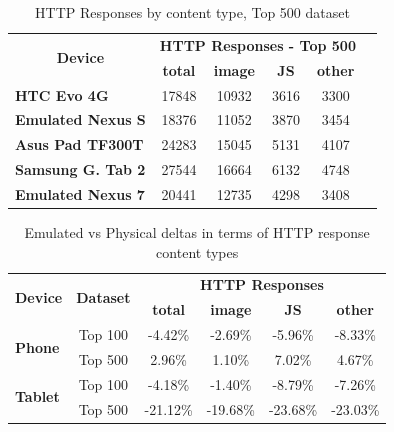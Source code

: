 \documentclass{acm_proc_article-sp}
\begin{document}
\begin{table}[htbp]
  \centering
  \caption{HTTP Responses by content type, Top 500 dataset}
    \begin{tabular}{|c|c|c|c|c|c|}
    \hline
    \multicolumn{1}{|c|}{\multirow{2}[4]{*}{\textbf{Device}}} & \multicolumn{4}{|c|}{\textbf{HTTP Responses - Top 500}} \\ \cline{2-5}
    \multicolumn{1}{|c|}{} & \textbf{total} & \textbf{image} & \textbf{JS} & \textbf{other} \\ \hline
    \multicolumn{1}{|l|}{\textbf{HTC Evo 4G}} & 17848 & 10932 & 3616  & 3300 \\
    \multicolumn{1}{|l|}{\textbf{Emulated Nexus S}} & 18376 & 11052 & 3870  & 3454 \\
    \multicolumn{1}{|l|}{\textbf{Asus Pad TF300T}} & 24283 & 15045 & 5131  & 4107 \\
    \multicolumn{1}{|l|}{\textbf{Samsung G. Tab 2}} & 27544 & 16664 & 6132  & 4748 \\
    \multicolumn{1}{|l|}{\textbf{Emulated Nexus 7}} & 20441 & 12735 & 4298  & 3408 \\
 \hline
    \end{tabular}%
  \label{tab:addlabel}%
\end{table}%

\begin{table}[htbp]
  \centering
  \caption{Emulated vs Physical deltas in terms of HTTP response content types}
    \begin{tabular}{|c|c|c|c|c|c|}
    \hline
    \multicolumn{1}{|c|}{\multirow{2}[4]{*}{\textbf{Device}}} & \multicolumn{1}{|c|}{\multirow{2}[4]{*}{\textbf{Dataset}}} & \multicolumn{4}{|c|}{\textbf{HTTP Responses}} \\ \cline{3-6}
    \multicolumn{1}{|c|}{} & \multicolumn{1}{|c|}{} & \multicolumn{1}{|c|}{\textbf{total}} & \multicolumn{1}{|c|}{\textbf{image}} & \multicolumn{1}{|c|}{\textbf{JS}} & \multicolumn{1}{|c|}{\textbf{other}} \\ \hline
    \multicolumn{1}{|l|}{\multirow{2}[4]{*}{\textbf{Phone}}} & Top 100 & -4.42\% & -2.69\% & -5.96\% & -8.33\% \\
    \multicolumn{1}{|l|}{} & Top 500 & 2.96\% & 1.10\% & 7.02\% & 4.67\% \\
    \multicolumn{1}{|l|}{\multirow{2}[4]{*}{\textbf{Tablet}}} & Top 100 & -4.18\% & -1.40\% & -8.79\% & -7.26\% \\
    \multicolumn{1}{|l|}{} & Top 500 & -21.12\% & -19.68\% & -23.68\% & -23.03\% \\ \hline
    \end{tabular}%
  \label{tab:addlabel}%
\end{table}%
\end{document}
